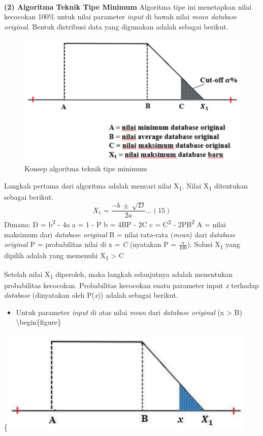\documentclass[
]{book}
\providecommand{\tightlist}{%
  \setlength{\itemsep}{0pt}\setlength{\parskip}{0pt}}
\begin{document}
~

\textbf{(2) Algoritma Teknik Tipe Minimum}
Algoritma tipe ini menetapkan nilai kecocokan 100\% untuk nilai parameter \emph{input} di bawah nilai \emph{mean database original}. Bentuk distribusi data yang digunakan adalah sebagai berikut.

\begin{figure}

{\centering \includegraphics[width=0.5\linewidth]{images/screening/tipe_minimum} 

}

\caption{Konsep algoritma teknik tipe minimum}\label{fig:unnamed-chunk-23}
\end{figure}

Langkah pertama dari algoritma adalah mencari nilai X\textsubscript{1}. Nilai X\textsubscript{1} ditentukan sebagai berikut.
\[X_1 = \frac{-b\ ±\ \sqrt{D} }{2a}...(15)\]
Dimana:
D = b\textsuperscript{2} - 4a
a = 1 - P
b = 4BP - 2C
c = C\textsuperscript{2} - 2PB\textsuperscript{2}
A = nilai maksimum dari \emph{database original}
B = nilai rata-rata (\emph{mean}) dari \emph{database original}
P = probabilitas nilai di x = \emph{C} (nyatakan P = \(\frac{\alpha}{100}\)).
Solusi X\textsubscript{1} yang dipilih adalah yang memenuhi X\textsubscript{1} \textgreater{} C

Setelah nilai X\textsubscript{1} diperoleh, maka langkah selanjutnya adalah menentukan probabilitas kecocokan. Probabilitas kecocokan suatu parameter input \emph{x} terhadap \emph{database} (dinyatakan oleh P(\emph{x})) adalah sebagai berikut.

\begin{itemize}
\tightlist
\item
  Untuk parameter \emph{input} di atas nilai \emph{mean} dari \emph{database original} (x \textgreater{} B)
  \textbackslash begin\{figure\}
\end{itemize}

\{\centering \includegraphics[width=0.5\linewidth]{images/screening/besarB1}
\end{document}
